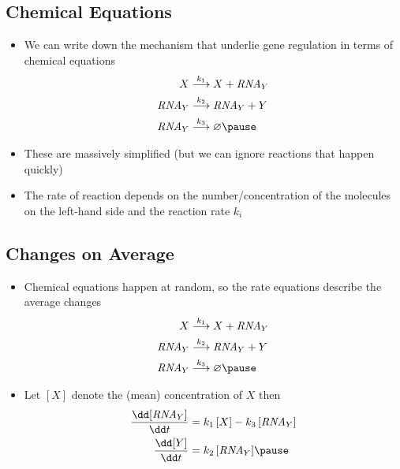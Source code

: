 \begin{slide}
\section{Chemical Equations}

\begin{PauseHighLight}
  \begin{itemize}
  \item We can write down the mechanism that underlie gene regulation in
    terms of chemical equations
    \begin{align*}
      X &\stackrel{k_1}{\longrightarrow} X + \RNA_Y \\
      \RNA_Y &\stackrel{k_2}{\longrightarrow} \RNA_Y + Y \\
      \RNA_Y &\stackrel{k_3}{\longrightarrow} \varnothing\pause
    \end{align*}
  \item These are massively simplified (but we can ignore reactions that
    happen quickly)\pause
  \item The rate of reaction depends on the number/concentration of the
    molecules on the left-hand side and the reaction rate $k_i$\pause
  \end{itemize}
\end{PauseHighLight}

\end{slide}


\begin{slide}
\section[-2]{Changes on Average}

\begin{PauseHighLight}
  \begin{itemize}
  \item Chemical equations happen at random, so the rate equations
    describe the average changes
    \begin{align*}
      X &\stackrel{k_1}{\longrightarrow} X + \RNA_Y \\
      \RNA_Y &\stackrel{k_2}{\longrightarrow} \RNA_Y + Y \\
      \RNA_Y &\stackrel{k_3}{\longrightarrow} \varnothing\pause
    \end{align*}
  \item Let $[X]$ denote the (mean) concentration of $X$ then
    \begin{align*}
      \frac{\dd [\RNA_Y]}{\dd t} &= k_1 \, [X] - k_3\,  [\RNA_Y] \\
      \frac{\dd [Y]}{\dd t} &= k_2 \, [\RNA_Y]\pause
    \end{align*}
  \end{itemize}
\end{PauseHighLight}

\end{slide}


